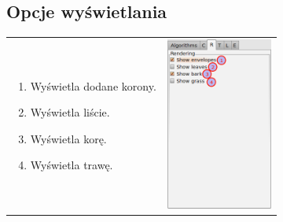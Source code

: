 \subsection{Opcje wyświetlania}
\begin{threeparttable}
\begin{tabular}{lr}
\parbox[c]{95mm}{
\begin{enumerate}
	\item {Wyświetla dodane korony.}
	\item {Wyświetla liście.}
	\item {Wyświetla korę.}
	\item {Wyświetla trawę.}
\end{enumerate}
} &
\parbox[c]{35mm}{
\includegraphics[width=35mm]{images/gui/rendering_panel.png}
}\\
\end{tabular}
\end{threeparttable}


